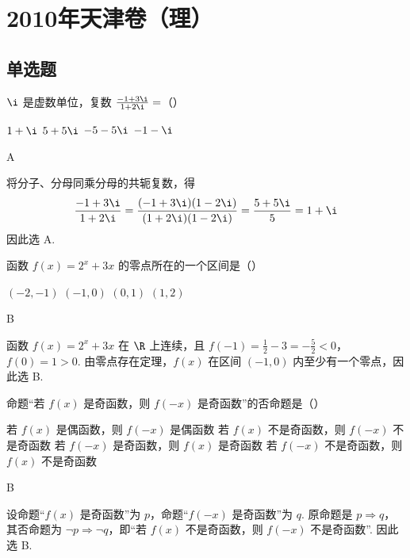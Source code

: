 \chapter{2010年天津卷（理）}

\section{单选题}

\begin{problem}
\(\i\) 是虚数单位，复数 \(\frac{-1 + 3\i}{1 + 2\i} =\)（\quad）

\choices
    {\(1 + \i\)}
    {\(5 + 5\i\)}
    {\(-5 - 5\i\)}
    {\(-1 - \i\)}
\begin{answer}
A
\end{answer}
\begin{solution}
将分子、分母同乘分母的共轭复数，得
\[
\frac{-1+3\i}{1+2\i}
=\frac{(-1+3\i)(1-2\i)}{(1+2\i)(1-2\i)}
=\frac{5+5\i}{5}=1+\i
\]
因此选 A.
\end{solution}
\end{problem}

\begin{problem}
函数 \(f(x)=2^{x}+3x\) 的零点所在的一个区间是（\quad）

\choices
    {\((-2,-1)\)}
    {\((-1,0)\)}
    {\((0,1)\)}
    {\((1,2)\)}
\begin{answer}
B
\end{answer}
\begin{solution}
函数 \(f(x)=2^x+3x\) 在 \(\R\) 上连续，且
\(f(-1)=\frac12-3=-\frac52<0\)，\(f(0)=1>0\).
由零点存在定理，\(f(x)\) 在区间 \((-1,0)\) 内至少有一个零点，因此选 B.
\end{solution}
\end{problem}

\begin{problem}
命题“若 \(f(x)\) 是奇函数，则 \(f(-x)\) 是奇函数”的否命题是（\quad）

\choices
    {若 \(f(x)\) 是偶函数，则 \(f(-x)\) 是偶函数}
    {若 \(f(x)\) 不是奇函数，则 \(f(-x)\) 不是奇函数}
    {若 \(f(-x)\) 是奇函数，则 \(f(x)\) 是奇函数}
    {若 \(f(-x)\) 不是奇函数，则 \(f(x)\) 不是奇函数}
\begin{answer}
B
\end{answer}
\begin{solution}
设命题“\(f(x)\) 是奇函数”为 \(p\)，命题“\(f(-x)\) 是奇函数”为 \(q\). 原命题是 \(p\Rightarrow q\)，其否命题为 \(\lnot p\Rightarrow\lnot q\)，即“若 \(f(x)\) 不是奇函数，则 \(f(-x)\) 不是奇函数”. 因此选 B.
\end{solution}
\end{problem}

